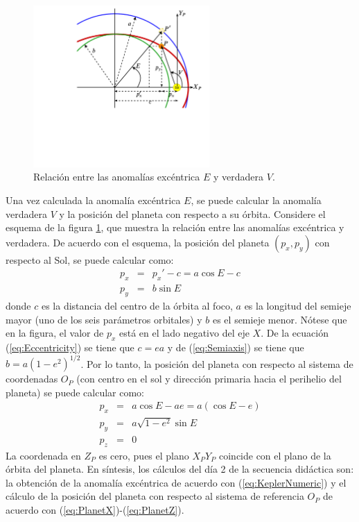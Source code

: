 \documentclass[a4paper,10pt]{article}
\begin{document}
\begin{figure}
  \centering
  \includegraphics[width=0.6\textwidth]{Figures/AnomaliesEV.pdf}
  \caption{Relación entre las anomalías excéntrica $E$ y verdadera $V$.}
  \label{fig:AnomaliesEV}
\end{figure}
Una vez calculada la anomalía excéntrica $E$, se puede calcular la anomalía verdadera $V$ y la posición del planeta con respecto a su órbita. Considere el esquema de la figura \ref{fig:AnomaliesEV}, que muestra la relación entre las anomalías excéntrica y verdadera. De acuerdo con el esquema, la posición del planeta $(p_x, p_y)$ con respecto al Sol, se puede calcular como:
\begin{eqnarray*}
  p_x &=& p_x' - c = a\cos E - c\\
  p_y &=& b\sin E 
\end{eqnarray*}
donde $c$ es la distancia del centro de la órbita al foco, $a$ es la longitud del semieje mayor (uno de los seis parámetros orbitales) y $b$ es el semieje menor. Nótese que en la figura, el valor de $p_x$ está en el lado negativo del eje $X$. De la ecuación (\ref{eq:Eccentricity}) se tiene que $c = ea$ y de (\ref{eq:Semiaxis}) se tiene que $b = a(1 - e^2)^{1/2}$. Por lo tanto, la posición del planeta con respecto al sistema de coordenadas $O_P$ (con centro en el sol y dirección primaria hacia el perihelio del planeta) se puede calcular como:
\begin{eqnarray}
  p_x &=& a\cos E - ae= a(\cos E - e)\label{eq:PlanetX}\\
  p_y &=& a\sqrt{1 - e^2}\sin E \label{eq:PlanetY}\\
  p_z &=& 0 \label{eq:PlanetZ}
\end{eqnarray}
La coordenada en $Z_P$ es cero, pues el plano $X_PY_P$ coincide con el plano de la órbita del planeta. En síntesis, los cálculos del día 2 de la secuencia didáctica son: la obtención de la anomalía excéntrica de acuerdo con (\ref{eq:KeplerNumeric}) y el cálculo de la posición del planeta con respecto al sistema de referencia $O_P$ de acuerdo con (\ref{eq:PlanetX})-(\ref{eq:PlanetZ}).
\end{document}
